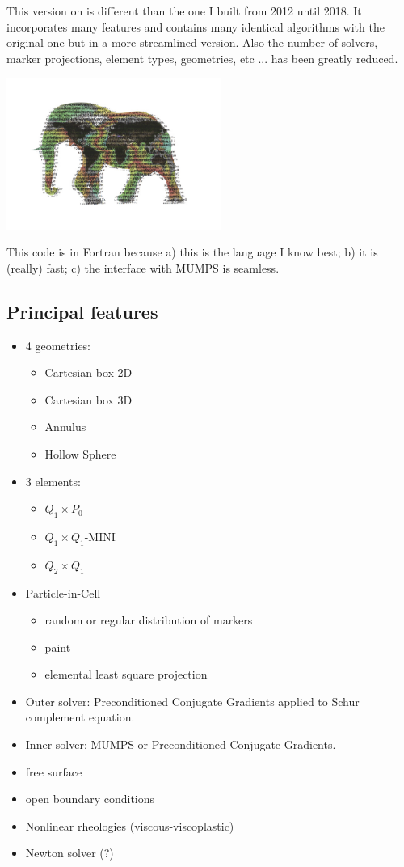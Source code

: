 
This version on \elefant is different than the one I built from 2012 until 2018.
It incorporates many features and contains many identical algorithms with the original 
one but in a more streamlined version. Also the number of solvers, marker projections, 
element types, geometries, etc ... has been greatly reduced. 

\begin{center}
\includegraphics[width=7cm]{images/elefant/logo_elefant_small}
\end{center}

This code is in Fortran because a) this is the language I know best; b) it is (really) fast;
c) the interface with MUMPS is seamless.  

\subsection{Principal features}

\begin{itemize}
\item 4 geometries:
\begin{itemize}
\item Cartesian box 2D
\item Cartesian box 3D
\item Annulus
\item Hollow Sphere
\end{itemize}
\item 3 elements:
\begin{itemize}
\item $Q_1\times P_0$
\item $Q_1\times Q_1$-MINI
\item $Q_2\times Q_1$
\end{itemize}
\item Particle-in-Cell
\begin{itemize}
\item random or regular distribution of markers
\item paint  
\item elemental least square projection
\end{itemize}
\item Outer solver: Preconditioned Conjugate Gradients applied to Schur complement equation.
\item Inner solver: MUMPS or Preconditioned Conjugate Gradients.
\item free surface
\item open boundary conditions
\item Nonlinear rheologies (viscous-viscoplastic)
\item Newton solver (?)
\end{itemize}

